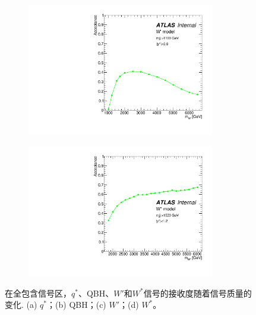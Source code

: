 \begin{figure}[htbp]
\begin{subfigure}{.5\textwidth}
   \caption{}
   \label{fig:QBH1}
  \end{subfigure}
\newline
  \begin{subfigure}{.5\textwidth}
  \centering
   \includegraphics[width=0.9\textwidth]{figuresDijet/03-BenchmarkSignals/Acc_Wprime.pdf}
   \caption{}
   \label{fig:WPrime1}
  \end{subfigure}
  \begin{subfigure}{.5\textwidth}
  \centering
   \includegraphics[width=0.9\textwidth]{figuresDijet/03-BenchmarkSignals/Acc_Wstar_yS1p2.pdf}
   \caption{}
   \label{fig:WStar1}
  \end{subfigure}
  \caption{
在全包含信号区，$q^*$、QBH、$W'$和$W^*$信号的接收度随着信号质量的变化.
(a) $q^*$；(b) QBH；(c) $W\prime$；(d) $W^*$。
  }
  \label{fig:ACCP}
\end{figure} 

